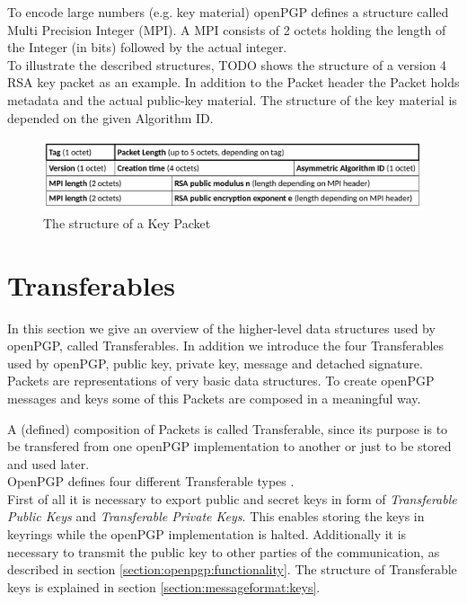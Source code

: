 To encode large numbers (e.g. key material) openPGP defines a structure called Multi Precision Integer (MPI). A MPI consists of 2 octets holding the length of the Integer (in bits) followed by the actual integer. \\


To illustrate the described structures, TODO shows the structure of a version 4 RSA key packet as an example. In addition to the Packet header the Packet holds metadata and the actual public-key material. The structure of the key material is depended on the given Algorithm ID.

\begin{figure}[h!]
\centering
\includegraphics[width=1\linewidth]{figures/packet-key.png}
\caption[]{The structure of a Key Packet}
\label{fig:packet-key}
\end{figure}


\section{Transferables}
\label{section:messageformat:transferables}

In this section we give an overview of the higher-level data structures used by openPGP, called Transferables. In addition we introduce the four Transferables used by openPGP, public key, private key, message and detached signature.  \\

Packets are representations of very basic data structures. To create openPGP messages and keys some of this Packets are composed in a meaningful way.

A (defined) composition of Packets is called Transferable, since its purpose is to be transfered from one openPGP implementation to another or just to be stored and used later. \\

OpenPGP defines four different Transferable types \cite[section 11]{RFC4880}. \\

First of all it is necessary to export public and secret keys in form of \textit{Transferable Public Keys} and \textit{Transferable Private Keys}. This enables storing the keys in keyrings while the openPGP implementation is halted. Additionally it is necessary to transmit the public key to other parties of the communication, as described in section \ref{section:openpgp:functionality}. The structure of Transferable keys is explained in section \ref{section:messageformat:keys}.  \\

